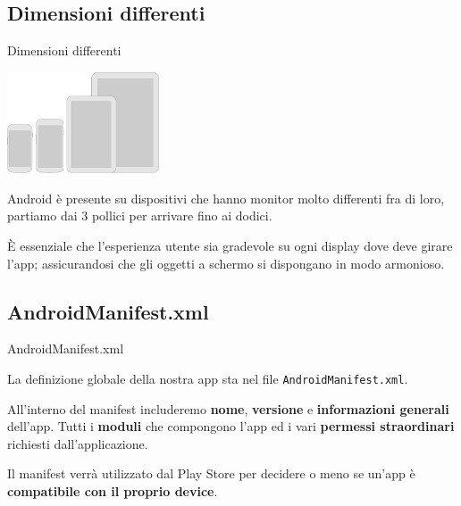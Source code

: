 \documentclass[xcolor=svgnames,11pt]{beamer}
\begin{document}
\subsection{Dimensioni differenti}
\begin{frame}{Dimensioni differenti}

\begin{center}

\includegraphics[height=3cm]{devices.png}

\end{center}

\medskip

Android \`e presente su dispositivi che hanno monitor molto differenti fra di loro, partiamo dai 3 pollici per arrivare fino ai dodici.

\medskip
\pause

\begin{block}{}
\`E essenziale che l'esperienza utente sia gradevole su ogni display dove deve girare l'app; assicurandosi che gli oggetti a schermo si dispongano in modo armonioso. 
\end{block}

\end{frame}

\subsection{AndroidManifest.xml}
\begin{frame}{AndroidManifest.xml}

La definizione globale della nostra app sta nel file \texttt{AndroidManifest.xml}.

\medskip
\pause

All'interno del manifest includeremo \textbf{nome}, \textbf{versione} e \textbf{informazioni generali} dell'app. Tutti i \textbf{moduli} che compongono l'app ed i vari \textbf{permessi straordinari} richiesti dall'applicazione.

\medskip
\pause

\begin{block}{}
Il manifest verr\`a utilizzato dal Play Store per decidere o meno se un'app \`e \textbf{compatibile con il proprio device}.
\end{block}

\end{frame}
\end{document}

